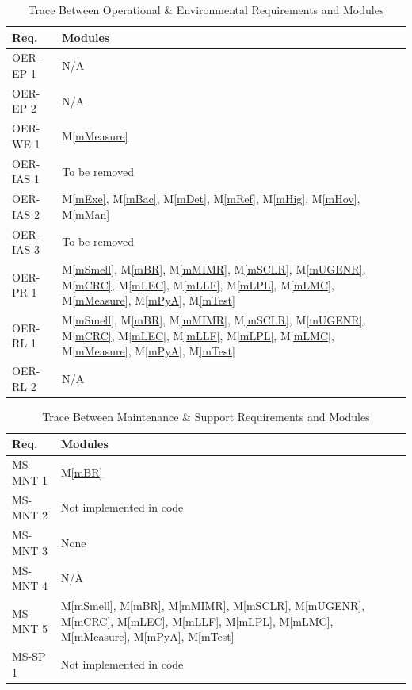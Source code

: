 \documentclass[12pt, titlepage]{article}
\newcommand{\mref}[1]{M\ref{#1}}
\begin{document}
\begin{table}[H]
  \centering
  \begin{tabular}{p{} p{}}
    \toprule \textbf{Req.} & \textbf{Modules}\\
    \midrule
    OER-EP 1 & N/A\\
    OER-EP 2 & N/A\\
    OER-WE 1 & \mref{mMeasure}\\
    OER-IAS 1 & To be removed\\
    OER-IAS 2 & \mref{mExe}, \mref{mBac}, \mref{mDet}, \mref{mRef}, \mref{mHig}, \mref{mHov}, \mref{mMan}\\
    OER-IAS 3 & To be removed\\
    OER-PR 1 & \mref{mSmell}, \mref{mBR}, \mref{mMIMR}, \mref{mSCLR}, \mref{mUGENR}, \mref{mCRC}, \mref{mLEC}, \mref{mLLF}, \mref{mLPL}, \mref{mLMC}, \mref{mMeasure}, \mref{mPyA}, \mref{mTest}\\
    OER-RL 1 & \mref{mSmell}, \mref{mBR}, \mref{mMIMR}, \mref{mSCLR}, \mref{mUGENR}, \mref{mCRC}, \mref{mLEC}, \mref{mLLF}, \mref{mLPL}, \mref{mLMC}, \mref{mMeasure}, \mref{mPyA}, \mref{mTest}\\
    OER-RL 2 & N/A\\
    \bottomrule
  \end{tabular}
  \caption{Trace Between Operational \& Environmental Requirements and Modules}
  \label{tab:OPE-mod}
\end{table}

\begin{table}[H]
  \centering
  \begin{tabular}{p{} p{}}
    \toprule \textbf{Req.} & \textbf{Modules}\\
    \midrule
    MS-MNT 1 & \mref{mBR}\\
    MS-MNT 2 & Not implemented in code\\
    MS-MNT 3 & None \\
    MS-MNT 4 & N/A\\
    MS-MNT 5 & \mref{mSmell}, \mref{mBR}, \mref{mMIMR}, \mref{mSCLR}, \mref{mUGENR}, \mref{mCRC}, \mref{mLEC}, \mref{mLLF}, \mref{mLPL}, \mref{mLMC}, \mref{mMeasure}, \mref{mPyA}, \mref{mTest}\\
    MS-SP 1 & Not implemented in code\\
    \bottomrule
  \end{tabular}
  \caption{Trace Between Maintenance \& Support Requirements and Modules}
  \label{tab:MS-mod}
\end{table}
\end{document}
